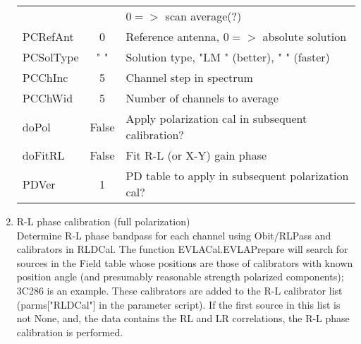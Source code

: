 \documentclass[11pt]{article}
\begin{document}
\begin{enumerate}
\begin{center}
\begin{tabular}{|l|c|l|}
          &        & $0=>$ scan average(?) \\
PCRefAnt  & 0      &  Reference antenna, $0=>$ absolute solution \\
PCSolType & "    " &  Solution type, "LM  " (better), "    " (faster)\\
PCChInc   & 5      &  Channel step in spectrum \\
PCChWid   & 5      &  Number of channels to average \\
doPol     & False  &  Apply polarization cal in subsequent calibration?\\
doFitRL   & False  &  Fit R-L (or X-Y) gain phase\\
PDVer     & 1      &  PD table to apply in subsequent polarization cal?\\
\hline
\end{tabular}
\end{center}
%
\newpage
\item R-L phase calibration (full polarization)\\
Determine R-L phase bandpass for each channel using Obit/RLPass
and calibrators in RLDCal.
The function EVLACal.EVLAPrepare will search for sources in the Field
table whose positions are those of calibrators with known position
angle (and presumably reasonable strength polarized components);
3C286 is an example.
These calibrators are added to the R-L calibrator list (parms["RLDCal"]
in the parameter script).
If the first source in this list is not None, and, the data contains
the RL and LR correlations, the R-L phase calibration is performed. 


\end{enumerate}
\end{document}
